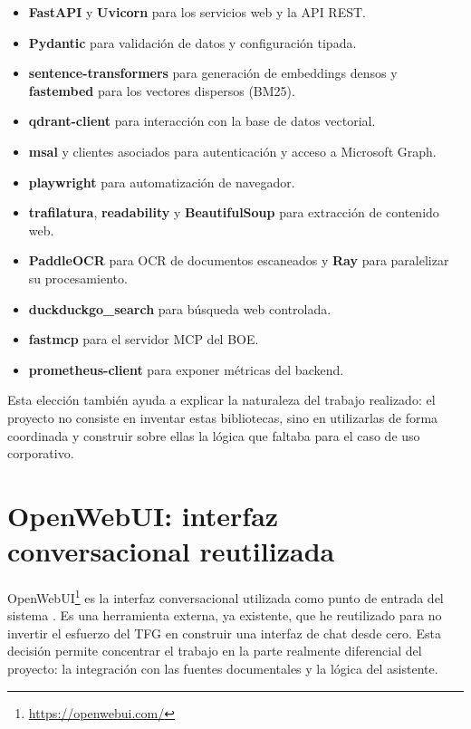 \begin{itemize}
    \item \textbf{FastAPI} y \textbf{Uvicorn} para los servicios web y la API REST.
    \item \textbf{Pydantic} para validación de datos y configuración tipada.
    \item \textbf{sentence-transformers} para generación de embeddings densos y \textbf{fastembed} para los vectores dispersos (BM25).
    \item \textbf{qdrant-client} para interacción con la base de datos vectorial.
    \item \textbf{msal} y clientes asociados para autenticación y acceso a Microsoft Graph.
    \item \textbf{playwright} para automatización de navegador.
    \item \textbf{trafilatura}, \textbf{readability} y \textbf{BeautifulSoup} para extracción de contenido web.
    \item \textbf{PaddleOCR} para OCR de documentos escaneados y \textbf{Ray} para paralelizar su procesamiento.
    \item \textbf{duckduckgo\_search} para búsqueda web controlada.
    \item \textbf{fastmcp} para el servidor MCP del BOE.
    \item \textbf{prometheus-client} para exponer métricas del backend.
\end{itemize}

Esta elección también ayuda a explicar la naturaleza del trabajo realizado: el proyecto no consiste en inventar estas bibliotecas, sino en utilizarlas de forma coordinada y construir sobre ellas la lógica que faltaba para el caso de uso corporativo.

\section{OpenWebUI: interfaz conversacional reutilizada}
\label{sec:openwebui}

OpenWebUI\footnote{\url{https://openwebui.com/}} es la interfaz conversacional utilizada como punto de entrada del sistema \cite{openwebui2024docs}. Es una herramienta externa, ya existente, que he reutilizado para no invertir el esfuerzo del TFG en construir una interfaz de chat desde cero. Esta decisión permite concentrar el trabajo en la parte realmente diferencial del proyecto: la integración con las fuentes documentales y la lógica del asistente.

